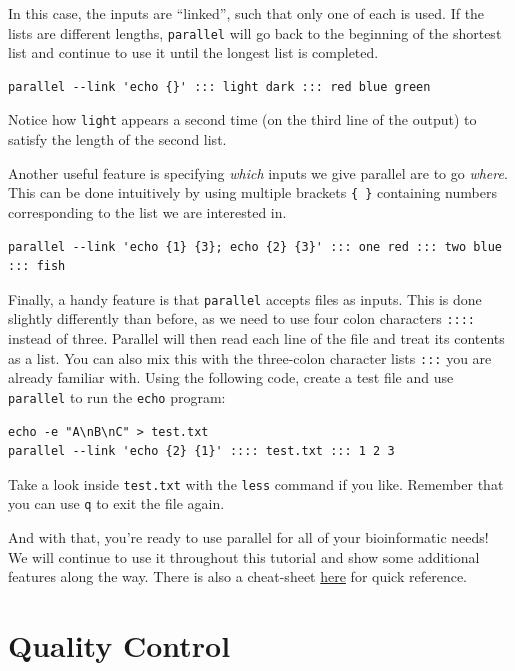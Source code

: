 \documentclass[
]{book}
\begin{document}
In this case, the inputs are ``linked'', such that only one of each is used. If the lists are different lengths, \texttt{parallel} will go back to the beginning of the shortest list and continue to use it until the longest list is completed.

\begin{verbatim}
parallel --link 'echo {}' ::: light dark ::: red blue green
\end{verbatim}

Notice how \texttt{light} appears a second time (on the third line of the output) to satisfy the length of the second list.

Another useful feature is specifying \emph{which} inputs we give parallel are to go \emph{where}. This can be done intuitively by using multiple brackets \texttt{\{\ \}} containing numbers corresponding to the list we are interested in.

\begin{verbatim}
parallel --link 'echo {1} {3}; echo {2} {3}' ::: one red ::: two blue ::: fish
\end{verbatim}

Finally, a handy feature is that \texttt{parallel} accepts files as inputs. This is done slightly differently than before, as we need to use four colon characters \texttt{::::} instead of three. Parallel will then read each line of the file and treat its contents as a list. You can also mix this with the three-colon character lists \texttt{:::} you are already familiar with. Using the following code, create a test file and use \texttt{parallel} to run the \texttt{echo} program:

\begin{verbatim}
echo -e "A\nB\nC" > test.txt
parallel --link 'echo {2} {1}' :::: test.txt ::: 1 2 3
\end{verbatim}

Take a look inside \texttt{test.txt} with the \texttt{less} command if you like. Remember that you can use \texttt{q} to exit the file again.

And with that, you're ready to use parallel for all of your bioinformatic needs! We will continue to use it throughout this tutorial and show some additional features along the way. There is also a cheat-sheet \href{https://www.gnu.org/software/parallel/parallel_cheat.pdf}{here} for quick reference.

\section{Quality Control}\label{quality-control}
\end{document}

